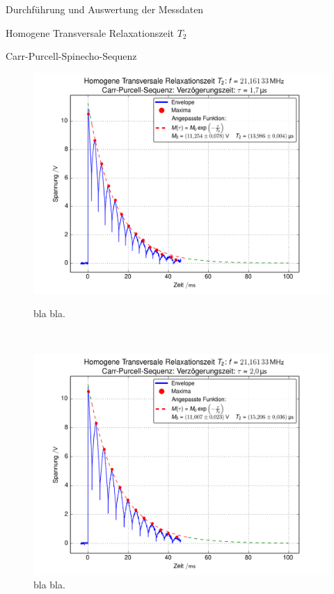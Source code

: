 \documentclass[pdftex, a4paper,11pt, twoside, ngerman]{report}
\begin{document}
\begin{chapter}{Durchführung und Auswertung der Messdaten}
\begin{section}{
        Homogene Transversale Relaxationszeit $T_{2}$}
\begin{subsection}{Carr-Purcell-Spinecho-Sequenz}
        
        \begin{figure}[htb]
          \centering
          \begin{minipage}{.48\textwidth}
            \centering
            \includegraphics[width=\textwidth]
            {Figures/HomoTransRelax_Carr0.png}
            \caption{bla bla.}
            \label{figCarr0}
          \end{minipage}\\
          \begin{minipage}{.48\textwidth}
            \centering
            \includegraphics[width=\textwidth]
            {Figures/HomoTransRelax_Carr1.png}
            \caption{bla bla.}
            \label{figCarr1}
          \end{minipage}\quad

\end{figure}
\end{subsection}
\end{section}
\end{chapter}
\end{document}
